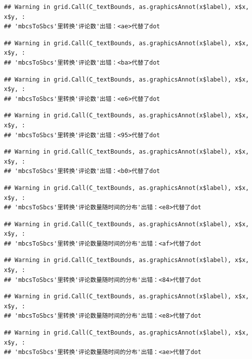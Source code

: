 \documentclass[
]{article}
\begin{document}
\begin{verbatim}
## Warning in grid.Call(C_textBounds, as.graphicsAnnot(x$label), x$x, x$y, :
## 'mbcsToSbcs'里转换'评论数'出错：<ae>代替了dot
\end{verbatim}

\begin{verbatim}
## Warning in grid.Call(C_textBounds, as.graphicsAnnot(x$label), x$x, x$y, :
## 'mbcsToSbcs'里转换'评论数'出错：<ba>代替了dot
\end{verbatim}

\begin{verbatim}
## Warning in grid.Call(C_textBounds, as.graphicsAnnot(x$label), x$x, x$y, :
## 'mbcsToSbcs'里转换'评论数'出错：<e6>代替了dot
\end{verbatim}

\begin{verbatim}
## Warning in grid.Call(C_textBounds, as.graphicsAnnot(x$label), x$x, x$y, :
## 'mbcsToSbcs'里转换'评论数'出错：<95>代替了dot
\end{verbatim}

\begin{verbatim}
## Warning in grid.Call(C_textBounds, as.graphicsAnnot(x$label), x$x, x$y, :
## 'mbcsToSbcs'里转换'评论数'出错：<b0>代替了dot
\end{verbatim}

\begin{verbatim}
## Warning in grid.Call(C_textBounds, as.graphicsAnnot(x$label), x$x, x$y, :
## 'mbcsToSbcs'里转换'评论数量随时间的分布'出错：<e8>代替了dot
\end{verbatim}

\begin{verbatim}
## Warning in grid.Call(C_textBounds, as.graphicsAnnot(x$label), x$x, x$y, :
## 'mbcsToSbcs'里转换'评论数量随时间的分布'出错：<af>代替了dot
\end{verbatim}

\begin{verbatim}
## Warning in grid.Call(C_textBounds, as.graphicsAnnot(x$label), x$x, x$y, :
## 'mbcsToSbcs'里转换'评论数量随时间的分布'出错：<84>代替了dot
\end{verbatim}

\begin{verbatim}
## Warning in grid.Call(C_textBounds, as.graphicsAnnot(x$label), x$x, x$y, :
## 'mbcsToSbcs'里转换'评论数量随时间的分布'出错：<e8>代替了dot
\end{verbatim}

\begin{verbatim}
## Warning in grid.Call(C_textBounds, as.graphicsAnnot(x$label), x$x, x$y, :
## 'mbcsToSbcs'里转换'评论数量随时间的分布'出错：<ae>代替了dot
\end{verbatim}
\end{document}
